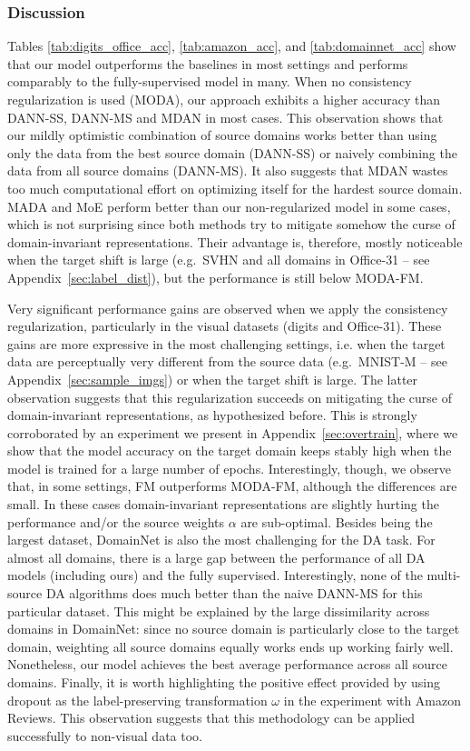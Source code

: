 \subsubsection{Discussion}
Tables \ref{tab:digits_office_acc}, \ref{tab:amazon_acc}, and \ref{tab:domainnet_acc} show that our model outperforms the baselines in most settings and performs comparably to the fully-supervised model in many. When no consistency regularization is used (MODA), our approach exhibits a higher accuracy than DANN-SS, DANN-MS and MDAN in most cases. This observation shows that our mildly optimistic combination of source domains works better than using only the data from the best source domain (DANN-SS) or naively combining the data from all source domains (DANN-MS). It also suggests that MDAN wastes too much computational effort on optimizing itself for the hardest source domain. MADA and MoE perform better than our non-regularized model in some cases, which is not surprising since both methods try to mitigate somehow the curse of domain-invariant representations. Their advantage is, therefore, mostly noticeable when the target shift is large (e.g.\ SVHN and all domains in Office-31 -- see Appendix~\ref{sec:label_dist}), but the performance is still below MODA-FM.

Very significant performance gains are observed when we apply the consistency regularization, particularly in the visual datasets (digits and Office-31). These gains are more expressive in the most challenging settings, i.e. when the target data are perceptually very different from the source data (e.g.\ MNIST-M -- see Appendix~\ref{sec:sample_imgs}) or when the target shift is large. The latter observation suggests that this regularization succeeds on mitigating the curse of domain-invariant representations, as hypothesized before. This is strongly corroborated by an experiment we present in Appendix~\ref{sec:overtrain}, where we show that the model accuracy on the target domain keeps stably high when the model is trained for a large number of epochs. Interestingly, though, we observe that, in some settings, FM outperforms MODA-FM, although the differences are small. In these cases domain-invariant representations are slightly hurting the performance and/or the source weights $\alpha$ are sub-optimal. Besides being the largest dataset, DomainNet is also the most challenging for the DA task. For almost all domains, there is a large gap between the performance of all DA models (including ours) and the fully supervised. Interestingly, none of the multi-source DA algorithms does much better than the naive DANN-MS for this particular dataset. This might be explained by the large dissimilarity across domains in DomainNet: since no source domain is particularly close to the target domain, weighting all source domains equally works ends up working fairly well. Nonetheless, our model achieves the best average performance across all source domains.  Finally, it is worth highlighting the positive effect provided by using dropout as the label-preserving transformation $\omega$ in the experiment with Amazon Reviews. This observation suggests that this methodology can be applied successfully to non-visual data too.

